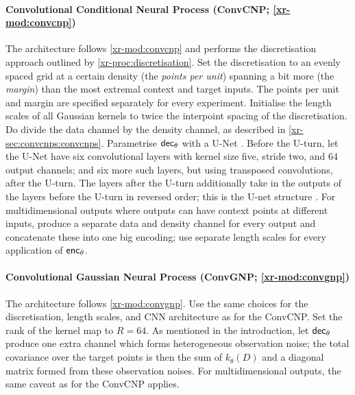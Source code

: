 \documentclass[12pt]{report}
\newcommand{\xrprefix}[1]{xr-#1}
\begin{document}
\paragraph{Convolutional Conditional Neural Process (ConvCNP; \cref{\xrprefix{mod:convcnp}})}
The architecture follows \cref{\xrprefix{mod:convcnp}} and performs the discretisation approach outlined by \eqref{\xrprefix{proc:discretisation}}.
Set the discretisation to an evenly spaced grid at a certain density (the \emph{points per unit}) spanning a bit more (the \emph{margin}) than the most extremal context and target inputs.
The points per unit and margin are specified separately for every experiment.
Initialise the length scales of all Gaussian kernels to twice the interpoint spacing of the discretisation.
Do divide the data channel by the density channel, as described in \cref{\xrprefix{sec:convcnps:convcnps}}.
Parametrise $\mathsf{dec}_\theta$ with a 
U-Net \parencite{Ronneberger:2015:U-Net_Convolutional_Networks_for_Biomedical}.
Before the U-turn, let the U-Net have six convolutional layers with kernel size five, stride two, and 64 output channels;
and six more such layers, but using transposed convolutions, after the U-turn.
The layers after the U-turn additionally take in the outputs of the layers before the U-turn in reversed order;
this is the U-net structure \parencite[Figure 1;][]{Ronneberger:2015:U-Net_Convolutional_Networks_for_Biomedical}.
For multidimensional outputs where outputs can have context points at different inputs, produce a separate data and density channel for every output and concatenate these into one big encoding;
use separate length scales for every application of $\mathsf{enc}_\theta$.

\paragraph{Convolutional Gaussian Neural Process (ConvGNP; \cref{\xrprefix{mod:convgnp}})}
The architecture follows \cref{\xrprefix{mod:convgnp}}.
Use the same choices for the discretisation, length scales, and CNN architecture as for the ConvCNP.
Set the rank of the kernel map to $R = 64$.
As mentioned in the introduction, let $\mathsf{dec}_\theta$ produce one extra channel which forms heterogeneous observation noise;
the total covariance over the target points is then the sum of $k_\theta(D)$ and a diagonal matrix formed from these observation noises.
For multidimensional outputs, the same caveat as for the ConvCNP applies.
\end{document}
